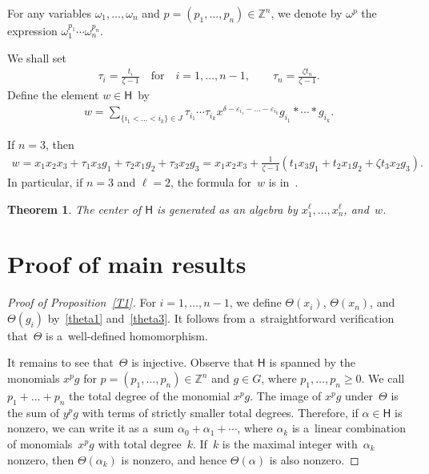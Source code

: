 \documentclass[11pt]{article}
\numberwithin{equation}{section}
\newtheorem{Theorem}{Theorem}[section]
\begin{document}
\begin{Notation}
For any variables $\omega_1, \ldots, \omega_n$ and $p=(p_1,\ldots,p_n)\in {\mathbb{Z}}^n$, we denote by $\omega^p$ the
expression $\omega_1^{p_1} \cdots \omega_n^{p_n}$.
\end{Notation}

We shall set
\begin{gather*}
\tau_i = \frac{t_i}{\zeta-1}
\quad
\text{for}
\quad
i=1,\ldots, n-1,
\qquad
\tau_n = \frac{\zeta t_n}{\zeta-1}.
\end{gather*}
Def\/ine the element $w \in \mathsf{H}$~by
\begin{gather*}
w = \sum\limits_{\{i_1<\dots<i_k\}\in J} \tau_{i_1}\cdots \tau_{i_k} x^{\delta-\varepsilon_{i_1} - \dots -
\varepsilon_{i_k}} g_{i_1}*\cdots * g_{i_k}.
\end{gather*}

\begin{Example}
If $n=3$, then
\begin{gather*}
w = x_1x_2x_3 +\tau_1 x_3 g_1 + \tau_2 x_1 g_2 + \tau_3 x_2 g_3
= x_1 x_2 x_3 +\frac{1}{\zeta-1} \left(t_1 x_3 g_1 + t_2 x_1 g_2 + \zeta t_3 x_2 g_3 \right).
\end{gather*}
In particular, if $n=3$ and $\ell=2$, the formula for~$w$ is in~\cite[Lemma~7.1]{CGW}.
\end{Example}

\begin{Theorem}
\label{T2}
The center of $\mathsf{H}$ is generated as an algebra by $x_1^\ell, \ldots, x_n^\ell$, and~$w$.
\end{Theorem}
\setcounter{section}{1}
\setcounter{subsection}{0}
\setcounter{subsubsection}{0}
\setcounter{Theorem}{8}
\setcounter{equation}{5}
\section{Proof of main results}\label{Section2}

\begin{proof}
[Proof of Proposition~\ref{T1}]
For $i=1,\ldots, n-1$, we def\/ine $\Theta(x_i)$, $\Theta(x_n)$, and $\Theta(g_i)$
by~\eqref{theta1} and~\eqref{theta3}.
It follows from a~straightforward verif\/ication that~$\Theta$ is a~well-def\/ined homomorphism.



It remains to see that~$\Theta$ is injective.
Observe that $\mathsf{H}$ is spanned by the monomials $x^p g$ for $p=(p_1,\dots,p_n)\in {\mathbb{Z}}^n$ and $g\in G$,
where $p_1,\ldots, p_n\ge 0$.
We call $p_1+\dots+p_n$ the total degree of the monomial $x^p g$.
The image of $x^p g$ under~$\Theta$ is the sum of $y^p g$ with terms of strictly smaller total degrees.
Therefore, if $\alpha\in \mathsf{H}$ is nonzero, we can write it as a~sum $\alpha_0 + \alpha_1 + \cdots$, where
$\alpha_k$ is a~linear combination of monomials~$x^p g$ with total degree~$k$.
If~$k$ is the maximal integer with~$\alpha_k$ nonzero, then $\Theta(\alpha_k)$ is nonzero, and hence $\Theta(\alpha)$ is
also nonzero.
\end{proof}
\end{document}
